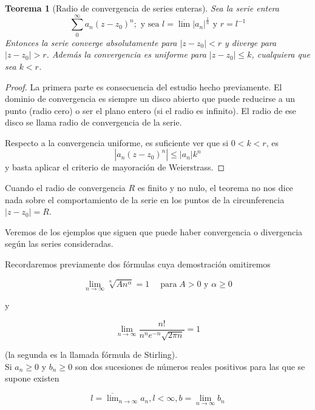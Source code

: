 \documentclass[10pt]{article}
\theoremstyle{plain}
\newtheorem{theorem}{Teorema}[section]
\theoremstyle{definition}
\theoremstyle{remark}
\begin{document}
\begin{theorem}[Radio de convergencia de series enteras]
Sea la serie entera
$$\sum_{0}^{\infty} a_{n}\left(z-z_{0}\right)^{n} ; \text{ y sea } l=\overline{\lim }\left|a_{n}\right|^{\frac{1}{n}} \text{ y } r=l^{-1}$$
Entonces la serie converge absolutamente para $\left|z-z_{0}\right|<r$ y diverge para $\left|z-z_{0}\right|>r$. Además la convergencia es uniforme para $\left|z-z_{0}\right| \leq k$, cualquiera que sea $k<r$.
\end{theorem}

\begin{proof}
La primera parte es consecuencia del estudio hecho previamente. El dominio de convergencia es siempre un disco abierto que puede reducirse a un punto (radio cero) o ser el plano entero (si el radio es infinito). El radio de ese disco se llama radio de convergencia de la serie.

Respecto a la convergencia uniforme, es suficiente ver que si $0<k<r$, es
$$\left|a_{n}\left(z-z_{0}\right)^{n}\right| \leq\left|a_{n}\right| k^{n}$$
y basta aplicar el criterio de mayoración de Weierstrass.
\end{proof}

Cuando el radio de convergencia $R$ es finito y no nulo, el teorema no nos dice nada sobre el comportamiento de la serie en los puntos de la circunferencia $\left|z-z_{0}\right|=R$.

Veremos de los ejemplos que siguen que puede haber convergencia o divergencia según las series consideradas.

Recordaremos previamente dos fórmulas cuya demostración omitiremos


\begin{equation*}
\lim _{n \rightarrow \infty} \sqrt[n]{A n^{\alpha}}=1 \quad \operatorname{para} A>0 \text { y } \alpha \geqslant 0 \tag{9-2}
\end{equation*}


y


\begin{equation*}
\lim _{n \rightarrow \infty} \frac{n!}{n^{n} e^{-n} \sqrt{2 \pi n}}=1 \tag{9-3}
\end{equation*}


(la segunda es la llamada fórmula de Stirling).\\
Si $a_{n} \geqslant 0$ y $b_{n} \geqslant 0$ son dos sucesiones de números reales positivos para las que se supone existen

$$
l=\overline{\lim }_{n \rightarrow \infty} a_{n}, l<\infty, b=\lim _{n \rightarrow \infty} b_{n}
$$
\end{document}
